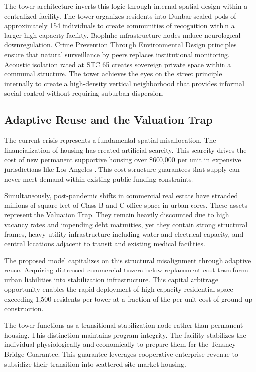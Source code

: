 \documentclass[12pt, letterpaper]{article}
\begin{document}
The tower architecture inverts this logic through internal spatial design within a centralized facility. The tower organizes residents into Dunbar-scaled pods of approximately 154 individuals to create communities of recognition within a larger high-capacity facility. Biophilic infrastructure nodes induce neurological downregulation. Crime Prevention Through Environmental Design principles ensure that natural surveillance by peers replaces institutional monitoring. Acoustic isolation rated at STC 65 creates sovereign private space within a communal structure. The tower achieves the eyes on the street principle internally to create a high-density vertical neighborhood that provides informal social control without requiring suburban dispersion.

\subsection{Adaptive Reuse and the Valuation Trap}

The current crisis represents a fundamental spatial misallocation. The financialization of housing has created artificial scarcity. This scarcity drives the cost of new permanent supportive housing over \$600,000 per unit in expensive jurisdictions like Los Angeles \citep{pacific_research_2024}. This cost structure guarantees that supply can never meet demand within existing public funding constraints.

Simultaneously, post-pandemic shifts in commercial real estate have stranded millions of square feet of Class B and C office space in urban cores. These assets represent the Valuation Trap. They remain heavily discounted due to high vacancy rates and impending debt maturities, yet they contain strong structural frames, heavy utility infrastructure including water and electrical capacity, and central locations adjacent to transit and existing medical facilities.

The proposed model capitalizes on this structural misalignment through adaptive reuse. Acquiring distressed commercial towers below replacement cost transforms urban liabilities into stabilization infrastructure. This capital arbitrage opportunity enables the rapid deployment of high-capacity residential space exceeding 1,500 residents per tower at a fraction of the per-unit cost of ground-up construction.

The tower functions as a transitional stabilization node rather than permanent housing. This distinction maintains program integrity. The facility stabilizes the individual physiologically and economically to prepare them for the Tenancy Bridge Guarantee. This guarantee leverages cooperative enterprise revenue to subsidize their transition into scattered-site market housing.
\end{document}
